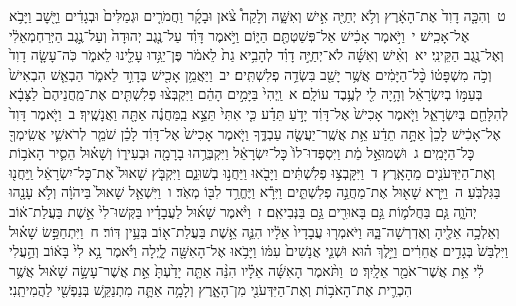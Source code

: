 \documentclass[18pt]{article}
\newcommand{\kri}[1]{\Afootnote{#1}}	%
\begin{document}
 {\loc ט~}וְהִכָּ֤ה דָוִד֙ אֶת־הָאָ֔רֶץ וְלֹ֥א יְחַיֶּ֖ה אִ֣ישׁ וְאִשָּׁ֑ה וְלָקַח֩ צֹ֨אן וּבָקָ֜ר וַחֲמֹרִ֤ים וּגְמַלִּים֙ וּבְגָדִ֔ים וַיָּ֖שׇׁב וַיָּבֹ֥א אֶל־אָכִֽישׁ׃ \startlock
 {\loc י~}וַיֹּ֣אמֶר אָכִ֔ישׁ אַל־פְּשַׁטְתֶּ֖ם הַיּ֑וֹם וַיֹּ֣אמֶר דָּוִ֗ד עַל־נֶ֤גֶב יְהוּדָה֙ וְעַל־נֶ֣גֶב הַיְּרַחְמְאֵלִ֔י וְאֶל־נֶ֖גֶב הַקֵּינִֽי׃ \startlock
 {\loc יא~}וְאִ֨ישׁ וְאִשָּׁ֜ה לֹא־יְחַיֶּ֣ה דָוִ֗ד לְהָבִ֥יא גַת֙ לֵאמֹ֔ר פֶּן־יַגִּ֥דוּ עָלֵ֖ינוּ לֵאמֹ֑ר כֹּֽה־עָשָׂ֤ה דָוִד֙ וְכֹ֣ה מִשְׁפָּט֔וֹ כׇּ֨ל־הַיָּמִ֔ים אֲשֶׁ֥ר יָשַׁ֖ב בִּשְׂדֵ֥ה פְלִשְׁתִּֽים׃ \startlock
 {\loc יב~}וַיַּאֲמֵ֥ן אָכִ֖ישׁ בְּדָוִ֣ד לֵאמֹ֑ר הַבְאֵ֤שׁ הִבְאִישׁ֙ בְּעַמּ֣וֹ בְיִשְׂרָאֵ֔ל וְהָ֥יָה לִ֖י לְעֶ֥בֶד עוֹלָֽם׃ 
\startlock
 {\loc א~}וַֽיְהִי֙ בַּיָּמִ֣ים הָהֵ֔ם וַיִּקְבְּצ֨וּ פְלִשְׁתִּ֤ים אֶת־מַֽחֲנֵיהֶם֙ לַצָּבָ֔א לְהִלָּחֵ֖ם בְּיִשְׂרָאֵ֑ל וַיֹּ֤אמֶר אָכִישׁ֙ אֶל־דָּוִ֔ד יָדֹ֣עַ תֵּדַ֗ע כִּ֤י אִתִּי֙ תֵּצֵ֣א בַֽמַּחֲנֶ֔ה אַתָּ֖ה וַאֲנָשֶֽׁיךָ׃ \startlock
 {\loc ב~}וַיֹּ֤אמֶר דָּוִד֙ אֶל־אָכִ֔ישׁ לָכֵן֙ אַתָּ֣ה תֵדַ֔ע אֵ֥ת אֲשֶֽׁר־יַעֲשֶׂ֖ה עַבְדֶּ֑ךָ וַיֹּ֤אמֶר אָכִישׁ֙ אֶל־דָּוִ֔ד לָכֵ֗ן שֹׁמֵ֧ר לְרֹאשִׁ֛י אֲשִֽׂימְךָ֖ כׇּל־הַיָּמִֽים׃ \startlock
 {\loc ג~}וּשְׁמוּאֵ֣ל מֵ֔ת וַיִּסְפְּדוּ־לוֹ֙ כׇּל־יִשְׂרָאֵ֔ל וַיִּקְבְּרֻ֥הוּ בָרָמָ֖ה וּבְעִיר֑וֹ וְשָׁא֗וּל הֵסִ֛יר הָאֹב֥וֹת וְאֶת־הַיִּדְּעֹנִ֖ים מֵהָאָֽרֶץ׃ \startlock
 {\loc ד~}וַיִּקָּבְצ֣וּ פְלִשְׁתִּ֔ים וַיָּבֹ֖אוּ וַיַּחֲנ֣וּ בְשׁוּנֵ֑ם וַיִּקְבֹּ֤ץ שָׁאוּל֙ אֶת־כׇּל־יִשְׂרָאֵ֔ל וַֽיַּחֲנ֖וּ בַּגִּלְבֹּֽעַ׃ \startlock
 {\loc ה~}וַיַּ֥רְא שָׁא֖וּל אֶת־מַחֲנֵ֣ה פְלִשְׁתִּ֑ים וַיִּרָ֕א וַיֶּחֱרַ֥ד לִבּ֖וֹ מְאֹֽד׃ \startlock
 {\loc ו~}וַיִּשְׁאַ֤ל שָׁאוּל֙ בַּיהֹוָ֔ה וְלֹ֥א עָנָ֖הוּ יְהֹוָ֑ה גַּ֧ם בַּחֲלֹמ֛וֹת גַּ֥ם בָּאוּרִ֖ים גַּ֥ם בַּנְּבִיאִֽם׃ \startlock
 {\loc ז~}וַיֹּ֨אמֶר שָׁא֜וּל לַעֲבָדָ֗יו בַּקְּשׁוּ־לִי֙ אֵ֣שֶׁת בַּעֲלַת־א֔וֹב וְאֵלְכָ֥ה אֵלֶ֖יהָ וְאֶדְרְשָׁה־בָּ֑הּ וַיֹּאמְר֤וּ עֲבָדָיו֙ אֵלָ֔יו הִנֵּ֛ה אֵ֥שֶׁת בַּעֲלַת־א֖וֹב בְּעֵ֥ין דּֽוֹר׃ \startlock
 {\loc ח~}וַיִּתְחַפֵּ֣שׂ שָׁא֗וּל וַיִּלְבַּשׁ֙ בְּגָדִ֣ים אֲחֵרִ֔ים וַיֵּ֣לֶךְ ה֗וּא וּשְׁנֵ֤י אֲנָשִׁים֙ עִמּ֔וֹ וַיָּבֹ֥אוּ אֶל־הָאִשָּׁ֖ה לָ֑יְלָה וַיֹּ֗אמֶר  \edtext{(קסומי)}{\kri{קרי: קָסֳמִי־}} נָ֥א לִי֙ בָּא֔וֹב וְהַ֣עֲלִי לִ֔י אֵ֥ת אֲשֶׁר־אֹמַ֖ר אֵלָֽיִךְ׃ \startlock
 {\loc ט~}וַתֹּ֨אמֶר הָאִשָּׁ֜ה אֵלָ֗יו הִנֵּ֨ה אַתָּ֤ה יָדַ֙עְתָּ֙ אֵ֣ת אֲשֶׁר־עָשָׂ֣ה שָׁא֔וּל אֲשֶׁ֥ר הִכְרִ֛ית אֶת־הָאֹב֥וֹת וְאֶת־הַיִּדְּעֹנִ֖י מִן־הָאָ֑רֶץ וְלָמָ֥ה אַתָּ֛ה מִתְנַקֵּ֥שׁ בְּנַפְשִׁ֖י לַהֲמִיתֵֽנִי׃ \startlock
\end{document}
